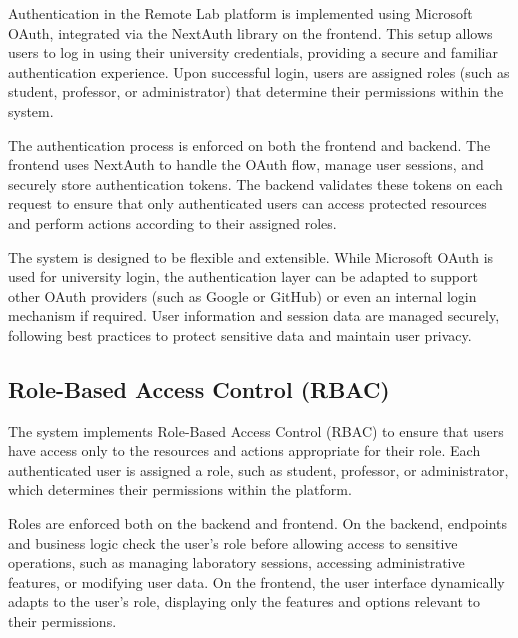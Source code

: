 Authentication in the Remote Lab platform is implemented using Microsoft OAuth, integrated via the NextAuth library on the frontend. This setup allows users to log in using their university credentials, providing a secure and familiar authentication experience. Upon successful login, users are assigned roles (such as student, professor, or administrator) that determine their permissions within the system.

The authentication process is enforced on both the frontend and backend. The frontend uses NextAuth to handle the OAuth flow, manage user sessions, and securely store authentication tokens. The backend validates these tokens on each request to ensure that only authenticated users can access protected resources and perform actions according to their assigned roles.

The system is designed to be flexible and extensible. While Microsoft OAuth is used for university login, the authentication layer can be adapted to support other OAuth providers (such as Google or GitHub) or even an internal login mechanism if required. User information and session data are managed securely, following best practices to protect sensitive data and maintain user privacy.

\subsection{Role-Based Access Control (RBAC)}

The system implements Role-Based Access Control (RBAC) to ensure that users have access only to the resources and actions appropriate for their role. Each authenticated user is assigned a role, such as student, professor, or administrator, which determines their permissions within the platform. 

Roles are enforced both on the backend and frontend. On the backend, endpoints and business logic check the user's role before allowing access to sensitive operations, such as managing laboratory sessions, accessing administrative features, or modifying user data. On the frontend, the user interface dynamically adapts to the user's role, displaying only the features and options relevant to their permissions.

